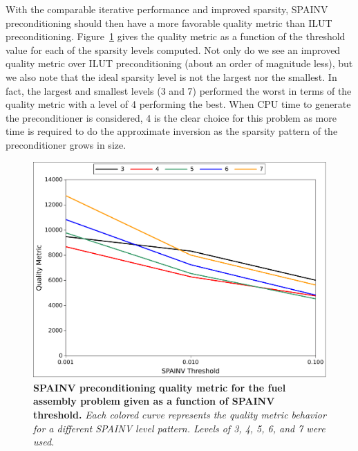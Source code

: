 With the comparable iterative performance and improved sparsity,
SPAINV preconditioning should then have a more favorable quality
metric than ILUT preconditioning. Figure~\ref{fig:spainv_quality}
gives the quality metric as a function of the threshold value for each
of the sparsity levels computed. Not only do we see an improved
quality metric over ILUT preconditioning (about an order of magnitude
less), but we also note that the ideal sparsity level is not the largest
nor the smallest. In fact, the largest and smallest levels (3 and 7)
performed the worst in terms of the quality metric with a level of 4
performing the best. When CPU time to generate the preconditioner is
considered, 4 is the clear choice for this problem as more time is
required to do the approximate inversion as the sparsity pattern of
the preconditioner grows in size.
\begin{figure}[t!]
  \begin{center}
    \includegraphics[width=6in]{chapters/spn_equations/spainv_quality.pdf}
  \end{center}
  \caption{\textbf{SPAINV preconditioning quality metric for the fuel
      assembly problem given as a function of SPAINV threshold.}
    \textit{Each colored curve represents the quality metric behavior
      for a different SPAINV level pattern. Levels of 3, 4, 5, 6, and
      7 were used.}}
  \label{fig:spainv_quality}
\end{figure}

\clearpage

